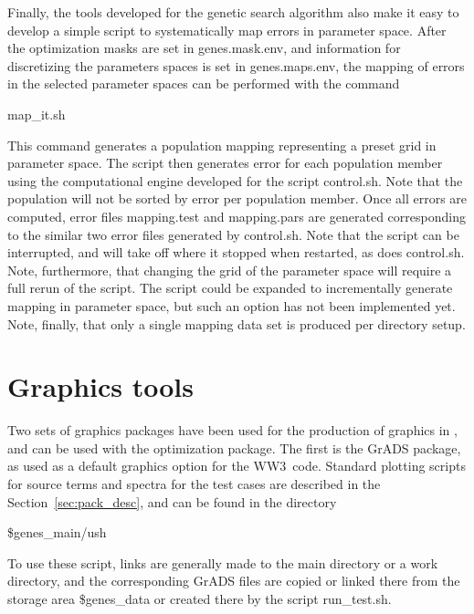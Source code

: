 \documentclass[12pt]{article}
\newcommand{\ws}{WW3}
\newcommand{\file}{\sf}
\newcommand{\pb}{\strut \vfill \pagebreak}
\newcommand{\bpage}{\vfill \pagebreak \strut

\vspace{2.5in} \centerline{This page is intentionally left blank.}}
\newcommand{\newsec}{\setcounter{equation}{0}
                      \setcounter{myfigno}{0}
                      \setcounter{mytabno}{0}}
\newcounter{myfigno}[section]
\newcounter{mytabno}[section]
\begin{document}
\vspace{\baselineskip}
\noindent
Finally, the tools developed for the genetic search algorithm also make it
easy to develop a simple script to systematically map errors in parameter
space. After the optimization masks are set in {\file genes.mask.env}, and
information for discretizing the parameters spaces is set in {\file
genes.maps.env}, the mapping of errors in the selected parameter spaces can be
performed with the command
\begin{center}
{\file map\_it.sh}
\end{center}
\noindent
This command generates a population {\file mapping} representing a preset grid
in parameter space. The script then generates error for each population member
using the computational engine developed for the script {\file
control.sh}. Note that the population will not be sorted by error per
population member. Once all errors are computed, error files {\file
mapping.test} and {\file mapping.pars} are generated corresponding to the
similar two error files generated by {\file control.sh}. Note that the script
can be interrupted, and will take off where it stopped when restarted, as does
{\file control.sh}. Note, furthermore, that changing the grid of the parameter
space will require a full rerun of the script. The script could be expanded to
incrementally generate mapping in parameter space, but such an option has not
been implemented yet. Note, finally, that only a single mapping data set is
produced per directory setup.


\pb
\section{Graphics tools} \label{sec:pack_graph}
\newsec

Two sets of graphics packages have been used for the production of graphics in
\cite{tol:MMAB10d}, and can be used with the optimization package. The first
is the GrADS package, as used as a default graphics option for the \ws\
code. Standard plotting scripts for source terms and spectra for the test
cases are described in the Section~\ref{sec:pack_desc}, and can be found in
the directory
\begin{center}
{\file \$genes\_main/ush}
\end{center}
\noindent
To use these script, links are generally made to the main directory or a work
directory, and the corresponding GrADS files are copied or linked there from
the storage area {\file \$genes\_data} or created there by the script {\file
run\_test.sh}.
\end{document}
